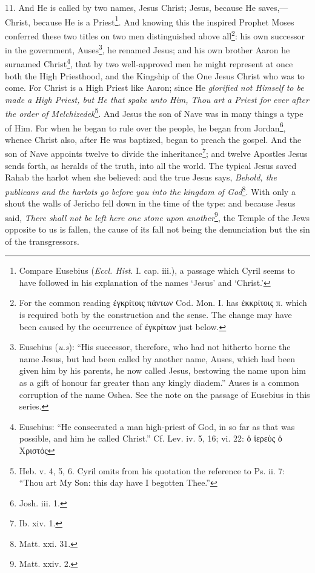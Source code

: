 11. And He is called by two names, Jesus Christ; Jesus, because He saves,—Christ, because He is a Priest\footnote{Compare Eusebius (\emph{Eccl. Hist}. I. cap. iii.), a passage which Cyril seems to have followed in his explanation of the names ‘Jesus’ and ‘Christ.’}. And knowing this the inspired Prophet Moses conferred these two titles on two men distinguished above all\footnote{For the common reading \textgreek{ἐγκρίτοις πάντων} Cod. Mon. I. has \textgreek{ἐκκρίτοις π.} which is required both by the construction and the sense. The change may have been caused by the occurrence of \textgreek{ἐγκρίτων} just below.}: his own successor in the government, Auses\footnote{Eusebius (\emph{u.s}): “His successor, therefore, who had not hitherto borne the name Jesus, but had been called by another name, Auses, which had been given him by his parents, he now called Jesus, bestowing the name upon him as a gift of honour far greater than any kingly diadem.” Auses is a common corruption of the name Oshea. See the note on the passage of Eusebius in this series.}, he renamed Jesus; and his own brother Aaron he surnamed Christ\footnote{Eusebius: “He consecrated a man high-priest of God, in so far as that was possible, and him he called Christ.” Cf. Lev. iv. 5, 16; vi. 22: \textgreek{ὁ ἱερεὺς ὁ Χριστός}}, that by two well-approved men he might represent at once both the High Priesthood, and the Kingship of the One Jesus Christ who was to come. For Christ is a High Priest like Aaron; since He \emph{glorified not Himself to be made a High Priest, but He that spake unto Him, Thou art a Priest for ever after the order of Melchizedek}\footnote{Heb. v. 4, 5, 6. Cyril omits from his quotation the reference to Ps. ii. 7: “Thou art My Son: this day have I begotten Thee.”}. And Jesus the son of Nave was in many things a type of Him. For when he began to rule over the people, he began from Jordan\footnote{Josh. iii. 1.}, whence Christ also, after He was baptized, began to preach the gospel. And the son of Nave appoints twelve to divide the inheritance\footnote{Ib. xiv. 1.}; and twelve Apostles Jesus sends forth, as heralds of the truth, into all the world. The typical Jesus saved Rahab the harlot when she believed: and the true Jesus says, \emph{Behold, the publicans and the harlots go before you into the kingdom of God}\footnote{Matt. xxi. 31.}. With only a shout the walls of Jericho fell down in the time of the type: and because Jesus said, \emph{There shall not be left here one stone upon another}\footnote{Matt. xxiv. 2.}, the Temple of the Jews opposite to us is fallen, the cause of its fall not being the denunciation but the sin of the transgressors.

